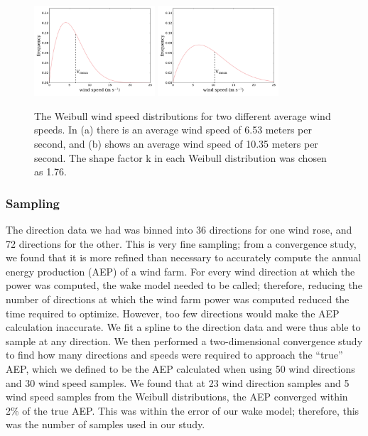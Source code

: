 \begin{figure}[htbp]
  \centering
  \includegraphics[trim={0 0.7cm 0 0.4cm},clip,width=0.4\textwidth]{Figures/weibull_6_53.pdf}\label{653}
  \includegraphics[trim={0 0.7cm 0 0.4cm},clip,width=0.4\textwidth]{Figures/weibull_10_35.pdf}\label{1035}
  \caption{\label{weibull} The Weibull wind speed distributions for two different average wind speeds. In (a) there is an average wind speed of 6.53 meters per second, and (b) shows an average wind speed of 10.35 meters per second. The shape factor k in each Weibull distribution was chosen as 1.76.}
\end{figure}


\subsubsection{Sampling}
The direction data we had was binned into 36 directions for one wind rose, and 72 directions for the other. This is very fine sampling;
from a convergence study, we found that it is more refined than necessary to accurately compute the annual energy production (AEP) of a wind farm. 
For every wind direction at which the power was computed, the wake model needed to be called; therefore, reducing the number of directions at which the wind farm power was computed reduced the time required to optimize. 
However, too few directions would make the AEP calculation inaccurate. We fit a spline to the direction data and were thus able to sample at any direction. We then performed a two-dimensional convergence study to find how many directions and speeds were required to approach the ``true'' AEP, which we defined to be the AEP calculated when using 50 wind directions and 30 wind speed samples. 
We found that at 23 wind direction samples and 5 wind speed samples from the Weibull distributions, the AEP converged within 2\% of the true AEP. This was within the error of our wake model; therefore, this was the number of samples used in our study. 